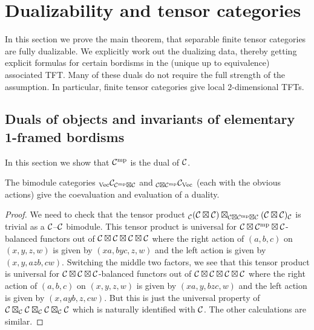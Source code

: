 \documentclass{amsart}
\begin{document}
\section{Dualizability and tensor categories} \label{sec-dualfusion}

In this section we prove the main theorem, that separable finite tensor categories are fully dualizable.  We explicitly work out the dualizing data, thereby getting explicit formulas for certain bordisms in the (unique up to equivalence) associated TFT.  Many of these duals do not require the full strength of the assumption.  In particular, finite tensor categories give local $2$-dimensional TFTs.

\subsection{Duals of objects and invariants of elementary 1-framed bordisms} \label{sec-df-objects}

In this section we show that $\mathcal C^{\mathrm{mp}}$ is the dual of $\mathcal C$. 

\begin{theorem} \label{thm:objduals}
The bimodule categories ${}_\mathrm{\mathrm{Vec}} \mathcal C_{\mathcal C^{\mathrm{mp}} \boxtimes \mathcal C}$ and ${}_{\mathcal C \boxtimes \mathcal C^{\mathrm{mp}}} \mathcal C_{\mathrm{Vec}}$ (each with the obvious actions) give the coevaluation and evaluation of a duality.
\end{theorem}
\begin{proof}
We need to check that the tensor product ${}_\mathcal C (\mathcal C \boxtimes \mathcal C) \boxtimes_{\mathcal C \boxtimes \mathcal C^{\mathrm{mp}} \boxtimes \mathcal C} (\mathcal C \boxtimes \mathcal C)_\mathcal C$ is trivial as a $\mathcal C$--$\mathcal C$ bimodule.  This tensor product is universal for $\mathcal C \boxtimes \mathcal C^{\mathrm{mp}} \boxtimes \mathcal C$-balanced functors out of $\mathcal C \boxtimes \mathcal C \boxtimes \mathcal C \boxtimes \mathcal C$ where the right action of $(a,b,c)$ on $(x,y,z,w)$ is given by $(xa,byc,z,w)$ and the left action is given by $(x,y,azb,cw)$.  Switching the middle two factors, we see that this tensor product is universal for $\mathcal C \boxtimes \mathcal C \boxtimes \mathcal C$-balanced functors out of $\mathcal C \boxtimes \mathcal C \boxtimes \mathcal C \boxtimes \mathcal C$ where the right action of $(a,b,c)$ on $(x,y,z,w)$ is given by $(xa,y, bzc, w)$ and the left action is given by $(x, ayb, z,cw)$.  But this is just the universal property of $\mathcal C \boxtimes_\mathcal C \mathcal C \boxtimes_\mathcal C \mathcal C \boxtimes_\mathcal C \mathcal C$ which is naturally identified with $\mathcal C$.  The other calculations are similar.
\end{proof}   
\end{document}
